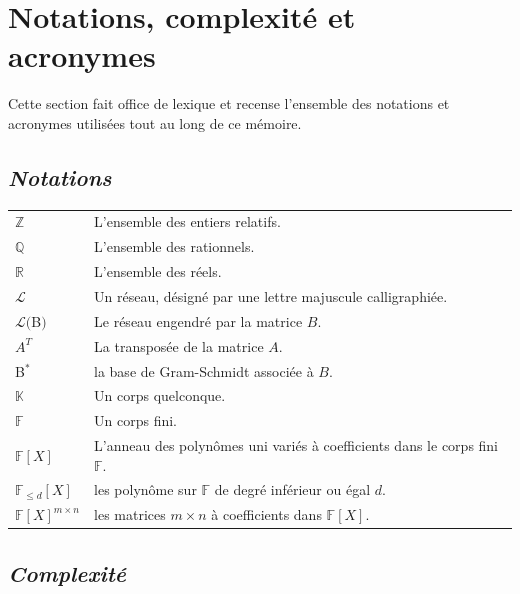 \documentclass[a4paper,12pt]{report}  %
\theoremstyle{definitionstyle}
\theoremstyle{examplestyle}
\theoremstyle{remarkstyle}
\theoremstyle{propositionstyle}
\theoremstyle{theoremstyle}
\theoremstyle{proofstyle}
\begin{document}
	\tableofcontents %
	
	\renewcommand{\listalgorithmname}{Table des algorithmes}
	\listofalgorithms %
	
	
\chapter*{Notations, complexité et acronymes}
	
Cette section fait office de lexique et recense l'ensemble des notations et acronymes utilisées tout au long de ce mémoire.
	
\section*{\textit{Notations}}
			
\begin{tabular}{@{}p{3cm}p{12cm}@{}}
	$\mathbb{Z}$ & L'ensemble des entiers relatifs.\\
	$\mathbb{Q}$ & L'ensemble des rationnels.\\
	$\mathbb{R}$ & L'ensemble des réels.\\
	$\mathcal{L}$ & Un réseau, désigné par une lettre majuscule calligraphiée.\\
	$\mathcal{L}($B$)$ & Le réseau engendré par la matrice $B$.\\
	$A^T$ & La transposée de la matrice $A$.\\
	B$^*$ & la base de Gram-Schmidt associée à $B$.\\
	$\mathbb{K}$ & Un corps quelconque.\\
	$\mathbb{F}$ & Un corps fini.\\
	$\mathbb{F}[X]$ & L'anneau des polynômes uni variés à coefficients dans le corps fini $\mathbb{F}$.\\
	$\mathbb{F}_{\leq d}[X]$ & les polynôme sur $\mathbb{F}$ de degré inférieur ou égal $d$.\\
	$\mathbb{F}[X]^{m\times n}$ & les matrices $m\times n$ à coefficients dans $\mathbb{F}[X]$.\\
\end{tabular}
	
\section*{\textit{Complexité}}
\end{document}
